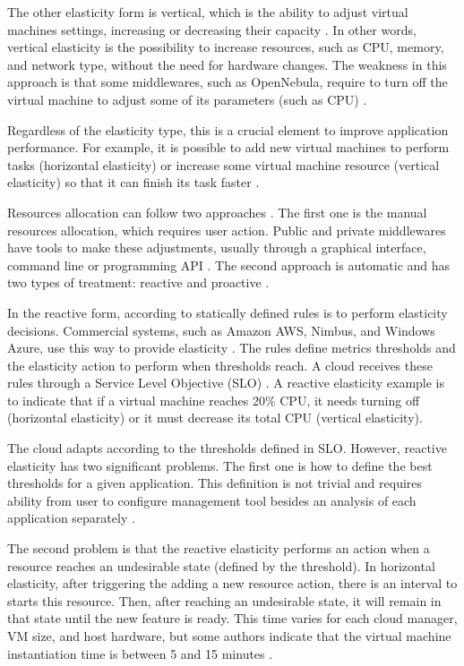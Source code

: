 The other elasticity form is vertical, which is the ability to adjust virtual machines settings, increasing or decreasing their capacity \cite{Spinner2014RuntimeEstimation}. In other words, vertical elasticity is the possibility to increase resources, such as CPU, memory, and network type, without the need for hardware changes. The weakness in this approach is that some middlewares, such as OpenNebula, require to turn off the virtual machine to adjust some of its parameters (such as CPU) \cite{Moreno-Vozmediano2012IaaSInfrastructures}.

Regardless of the elasticity type, this is a crucial element to improve application performance. For example, it is possible to add new virtual machines to perform tasks (horizontal elasticity) or increase some virtual machine resource (vertical elasticity) so that it can finish its task faster \cite{Righi2013ElasticidadeDesafios}. 

Resources allocation can follow two approaches \cite{Righi2013ElasticidadeDesafios}. The first one is the manual resources allocation, which requires user action. Public and private middlewares have tools to make these adjustments, usually through a graphical interface, command line or programming API \cite{Righi2013ElasticidadeDesafios}. The second approach is automatic and has two types of treatment: reactive and proactive \cite{Righi2013ElasticidadeDesafios}. 

In the reactive form, according to statically defined rules is to perform elasticity decisions. Commercial systems, such as Amazon AWS, Nimbus, and Windows Azure, use this way to provide elasticity \cite{Righi2013ElasticidadeDesafios}. The rules define metrics thresholds and the elasticity action to perform when thresholds reach. A cloud receives these rules through a Service Level Objective (SLO) \cite{Spinner2014RuntimeEstimation}. A reactive elasticity example is to indicate that if a virtual machine reaches 20\% CPU, it needs turning off (horizontal elasticity) or it must decrease its total CPU (vertical elasticity).

The cloud adapts according to the thresholds defined in SLO. However, reactive elasticity has two significant problems. The first one is how to define the best thresholds for a given application. This definition is not trivial and requires ability from user to configure management tool besides an analysis of each application separately \cite{Righi2013ElasticidadeDesafios}.

The second problem is that the reactive elasticity performs an action when a resource reaches an undesirable state (defined by the threshold). In horizontal elasticity, after triggering the adding a new resource action, there is an interval to starts this resource. Then, after reaching an undesirable state, it will remain in that state until the new feature is ready. This time varies for each cloud manager, VM size,  and host hardware, but some authors indicate that the virtual machine instantiation time is between 5 and 15 minutes \cite{Bankole2013CloudEnvironment, Brebner2012IsEnough}.

